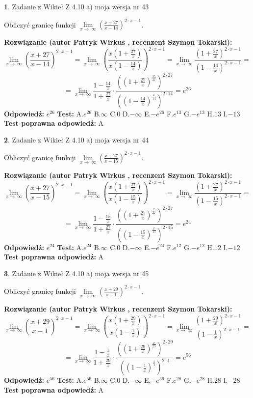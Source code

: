 \documentclass[12pt, a4paper]{article}
\theoremstyle{definition} %
\newtheorem{zad}{}
\newcommand{\zadStart}[1]{\begin{zad}#1\newline}
\newcommand{\zadStop}{\end{zad}}
\newcommand{\rozwStart}[2]{\noindent \textbf{Rozwiązanie (autor #1 , recenzent #2): }\newline}
\newcommand{\rozwStop}{\newline}
\newcommand{\odpStart}{\noindent \textbf{Odpowiedź:}\newline}
\newcommand{\odpStop}{\newline}
\newcommand{\testStart}{\noindent \textbf{Test:}\newline}
\newcommand{\testStop}{\newline}
\newcommand{\kluczStart}{\noindent \textbf{Test poprawna odpowiedź:}\newline}
\newcommand{\kluczStop}{\newline}
\begin{document}
\zadStart{Zadanie z Wikieł Z 4.10 a) moja wersja nr 43}

Obliczyć granicę funkcji  $\lim\limits_{x\to\ \infty}(\frac{x+27}{x-14})^{2\cdot x-1}$.
\zadStop
\rozwStart{Patryk Wirkus}{Szymon Tokarski}
$$\lim\limits_{x\to\ \infty}(\frac{x+27}{x-14})^{2\cdot x-1} = \lim\limits_{x\to\ \infty}(\frac{x(1+\frac{27}{x})}{x(1-\frac{14}{x})})^{2\cdot x-1}=\lim\limits_{x\to\ \infty}\frac{(1+\frac{27}{x})^{2\cdot x-1}}{(1-\frac{14}{x})^{2\cdot x-1}}=$$
$$=\lim\limits_{x\to\ \infty}\frac{1-\frac{14}{x}}{1+\frac{27}{x}}\cdot\frac{((1+\frac{27}{x})^{\frac{x}{27}})^{2\cdot27}}{((1-\frac{14}{x})^{\frac{x}{14}})^{2\cdot14}}=e^{26}$$
\rozwStop
\odpStart
$e^{26}$
\odpStop
\testStart
A.$e^{26}$ B.$\infty$ C.$0$ D.$-\infty$ E.$-e^{26}$
F.$e^{13}$ G.$-e^{13}$
H.$13$
I.$-13$
\testStop
\kluczStart
A
\kluczStop



\zadStart{Zadanie z Wikieł Z 4.10 a) moja wersja nr 44}

Obliczyć granicę funkcji  $\lim\limits_{x\to\ \infty}(\frac{x+27}{x-15})^{2\cdot x-1}$.
\zadStop
\rozwStart{Patryk Wirkus}{Szymon Tokarski}
$$\lim\limits_{x\to\ \infty}(\frac{x+27}{x-15})^{2\cdot x-1} = \lim\limits_{x\to\ \infty}(\frac{x(1+\frac{27}{x})}{x(1-\frac{15}{x})})^{2\cdot x-1}=\lim\limits_{x\to\ \infty}\frac{(1+\frac{27}{x})^{2\cdot x-1}}{(1-\frac{15}{x})^{2\cdot x-1}}=$$
$$=\lim\limits_{x\to\ \infty}\frac{1-\frac{15}{x}}{1+\frac{27}{x}}\cdot\frac{((1+\frac{27}{x})^{\frac{x}{27}})^{2\cdot27}}{((1-\frac{15}{x})^{\frac{x}{15}})^{2\cdot15}}=e^{24}$$
\rozwStop
\odpStart
$e^{24}$
\odpStop
\testStart
A.$e^{24}$ B.$\infty$ C.$0$ D.$-\infty$ E.$-e^{24}$
F.$e^{12}$ G.$-e^{12}$
H.$12$
I.$-12$
\testStop
\kluczStart
A
\kluczStop



\zadStart{Zadanie z Wikieł Z 4.10 a) moja wersja nr 45}

Obliczyć granicę funkcji  $\lim\limits_{x\to\ \infty}(\frac{x+29}{x-1})^{2\cdot x-1}$.
\zadStop
\rozwStart{Patryk Wirkus}{Szymon Tokarski}
$$\lim\limits_{x\to\ \infty}(\frac{x+29}{x-1})^{2\cdot x-1} = \lim\limits_{x\to\ \infty}(\frac{x(1+\frac{29}{x})}{x(1-\frac{1}{x})})^{2\cdot x-1}=\lim\limits_{x\to\ \infty}\frac{(1+\frac{29}{x})^{2\cdot x-1}}{(1-\frac{1}{x})^{2\cdot x-1}}=$$
$$=\lim\limits_{x\to\ \infty}\frac{1-\frac{1}{x}}{1+\frac{29}{x}}\cdot\frac{((1+\frac{29}{x})^{\frac{x}{29}})^{2\cdot29}}{((1-\frac{1}{x})^{\frac{x}{1}})^{2\cdot1}}=e^{56}$$
\rozwStop
\odpStart
$e^{56}$
\odpStop
\testStart
A.$e^{56}$ B.$\infty$ C.$0$ D.$-\infty$ E.$-e^{56}$
F.$e^{28}$ G.$-e^{28}$
H.$28$
I.$-28$
\testStop
\kluczStart
A
\kluczStop
\end{document}
